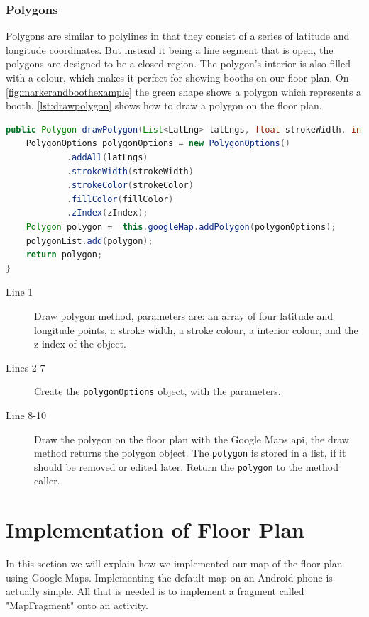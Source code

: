 \subsubsection*{Polygons}
Polygons are similar to polylines in that they consist of a series of latitude and longitude coordinates. But instead it being a line segment that is open, the polygons are designed to be a closed region. The polygon's interior is also filled with a colour, which makes it perfect for showing booths on our floor plan. On \autoref{fig:markerandboothexample} the green shape shows a polygon which represents a booth. \autoref{lst:drawpolygon} shows how to draw a polygon on the floor plan.
\begin{lstlisting}[language=java, label=lst:drawpolygon, caption=Method for drawing a polygon.]
public Polygon drawPolygon(List<LatLng> latLngs, float strokeWidth, int strokeColor, int fillColor, int zIndex){
    PolygonOptions polygonOptions = new PolygonOptions()
            .addAll(latLngs)
            .strokeWidth(strokeWidth)
            .strokeColor(strokeColor)
            .fillColor(fillColor)
            .zIndex(zIndex);
    Polygon polygon =  this.googleMap.addPolygon(polygonOptions);
    polygonList.add(polygon);
    return polygon;
}
\end{lstlisting}
\begin{description}
\item[Line 1] Draw polygon method, parameters are: an array of four latitude and longitude points, a stroke width, a stroke colour, a interior colour, and the z-index of the object. 
\item[Lines 2-7] Create the \lstinline|polygonOptions| object, with the parameters.
\item[Line 8-10] Draw the polygon on the floor plan with the Google Maps \ac{api}, the draw method returns the polygon object. The \lstinline|polygon| is stored in a list, if it should be removed or edited later. Return the \lstinline|polygon| to the method caller.
\end{description}

\section{Implementation of Floor Plan}
In this section we will explain how we implemented our map of the floor plan using Google Maps. Implementing the default map on an Android phone is actually simple. All that is needed is to implement a fragment called "MapFragment" onto an activity.

